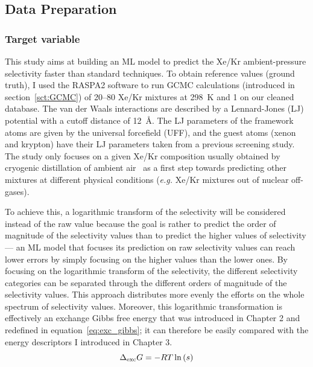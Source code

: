 \documentclass[main]{subfiles}
\begin{document}
\subsection{Data Preparation}

\subsubsection{Target variable}

This study aims at building an ML model to predict the Xe/Kr ambient-pressure selectivity faster than standard techniques. To obtain reference values (ground truth), I used the RASPA2 software\autocite{dubbeldam2016} to run GCMC calculations (introduced in section~\ref{sct:GCMC}) of 20–80 Xe/Kr mixtures at \SI{298}{\kelvin} and \SI{1}{\atm} on our cleaned database. The van der Waals interactions are described by a Lennard-Jones (LJ) potential with a cutoff distance of \SI{12}{\angstrom}. The LJ parameters of the framework atoms are given by the universal forcefield (UFF),\autocite{rappe1992} and the guest atoms (xenon and krypton) have their LJ parameters taken from a previous screening study.\autocite{Ryan_2010} The study only focuses on a given Xe/Kr composition usually obtained by cryogenic distillation of ambient air~\autocite{kerry2007industrial} as a first step towards predicting other mixtures at different physical conditions (\emph{e.g.} Xe/Kr mixtures out of nuclear off-gases). 

To achieve this, a logarithmic transform of the selectivity will be considered instead of the raw value because the goal is rather to predict the order of magnitude of the selectivity values than to predict the higher values of selectivity --- an ML model that focuses its prediction on raw selectivity values can reach lower errors by simply focusing on the higher values than the lower ones. By focusing on the logarithmic transform of the selectivity, the different selectivity categories can be separated through the different orders of magnitude of the selectivity values. This approach distributes more evenly the efforts on the whole spectrum of selectivity values. Moreover, this logarithmic transformation is effectively an exchange Gibbs free energy that was introduced in Chapter 2 and redefined in equation~\ref{eq:exc_gibbs}; it can therefore be easily compared with the energy descriptors I introduced in Chapter 3.
\begin{equation}\label{eq:exc_gibbs}
  \Delta_{\text{exc}}G = -RT \ln\left(s\right)
\end{equation}
\end{document}
